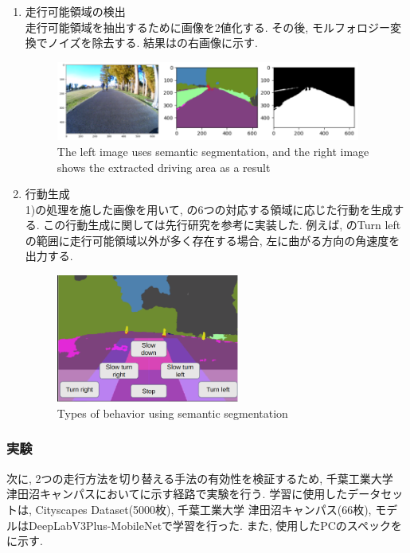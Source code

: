 \documentclass[uplatex, twocolumn, 9pt]{jsproceedings}
\begin{document}
  \newpage
  \begin{enumerate}
    \item 走行可能領域の検出\\
  走行可能領域を抽出するために画像を2値化する. その後, モルフォロジー変換\cite{morphological}でノイズを除去する. 結果はの右画像に示す.
  \begin{figure}[h]
    \centering
    \includegraphics[width=100mm]{fig/tsukuba-seg.pdf}
    \caption{The left image uses semantic segmentation, and the right image shows the extracted driving area as a result}
    \label{fig:seg_runarea}%
  \end{figure}
  \item 行動生成\\
  1)の処理を施した画像を用いて, の6つの対応する領域に応じた行動を生成する. この行動生成に関しては先行研究\cite{meiji-thesis}を参考に実装した. 例えば, のTurn leftの範囲に走行可能領域以外が多く存在する場合, 左に曲がる方向の角速度を出力する. 
  \begin{figure}[h]
    \centering
    \includegraphics[width=60mm]{fig/seg.pdf}
    \caption{Types of behavior using semantic segmentation}
    \label{fig:seg}%
  \end{figure}
\end{enumerate}

\subsubsection{実験}
次に, 2つの走行方法を切り替える手法の有効性を検証するため, 千葉工業大学 津田沼キャンパスにおいてに示す経路で実験を行う. 学習に使用したデータセットは, Cityscapes Dataset\cite{cityscapes}(5000枚), 千葉工業大学 津田沼キャンパス(66枚), モデルはDeepLabV3Plus-MobileNetで学習を行った. また, 使用したPCのスペックをに示す. 
\end{document}
